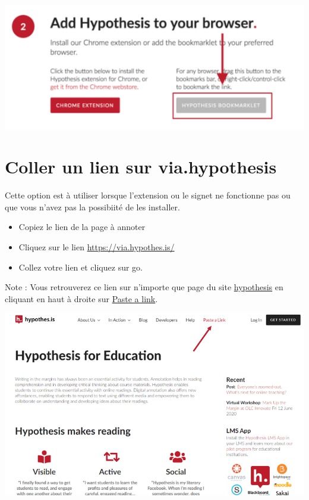 \documentclass[
]{book}
\providecommand{\tightlist}{%
  \setlength{\itemsep}{0pt}\setlength{\parskip}{0pt}}
\begin{document}
\includegraphics{img/10bf5d0ce6574ed9cbaa1f7df259038a.png}

\hypertarget{s23}{%
\section{Coller un lien sur via.hypothesis}\label{s23}}

Cette option est à utiliser lorsque l'extension ou le signet ne fonctionne pas ou que vous n'avez pas la possibiité de les installer.

\begin{itemize}
\tightlist
\item
  Copiez le lien de la page à annoter
\item
  Cliquez sur le lien \url{https://via.hypothes.is/}
\item
  Collez votre lien et cliquez sur go.
\end{itemize}

Note : Vous retrouverez ce lien sur n'importe que page du site \href{https://web.hypothes.is/}{hypothesis} en cliquant en haut à droite sur \href{https://via.hypothes.is/}{Paste a link}.

\includegraphics{img/31f63f99822907f0d22ec643cca557dd.png}
\end{document}
